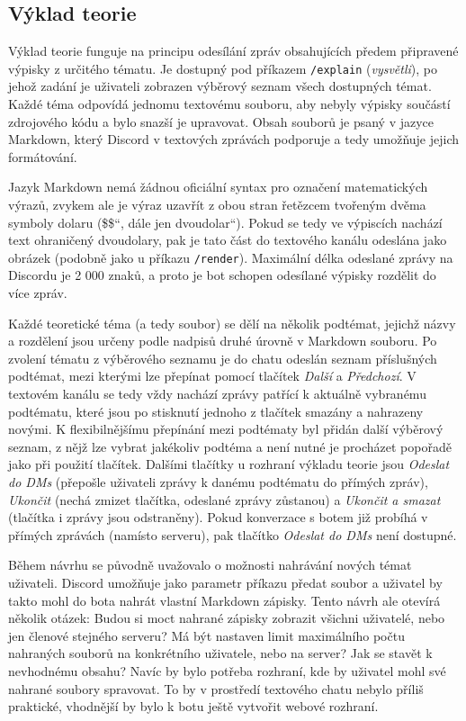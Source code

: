 \documentclass[FM]{tulthesis}
\begin{document}
	\subsection{Výklad teorie}
	
	Výklad teorie funguje na principu odesílání zpráv obsahujících předem připravené výpisky z určitého tématu. Je dostupný pod příkazem \verb*|/explain| (\textit{vysvětli}), po jehož zadání je uživateli zobrazen výběrový seznam všech dostupných témat. Každé téma odpovídá jednomu textovému souboru, aby nebyly výpisky součástí zdrojového kódu a bylo snazší je upravovat. Obsah souborů je psaný v jazyce Markdown, který Discord v textových zprávách podporuje a tedy umožňuje jejich formátování.
	
	Jazyk Markdown nemá žádnou oficiální syntax pro označení matematických výrazů, zvykem ale je výraz uzavřít z obou stran řetězcem tvořeným dvěma symboly dolaru (\quotedblbase\$\$\textquotedblleft, dále jen \quotedblbase dvoudolar\textquotedblleft). Pokud se tedy ve výpiscích nachází text ohraničený dvoudolary, pak je tato část do textového kanálu odeslána jako obrázek (podobně jako u příkazu \verb*|/render|). Maximální délka odeslané zprávy na Discordu je 2 000 znaků, a proto je bot schopen odesílané výpisky rozdělit do více zpráv. %
	
	Každé teoretické téma (a tedy soubor) se dělí na několik podtémat, jejichž názvy a rozdělení jsou určeny podle nadpisů druhé úrovně v Markdown souboru. Po zvolení tématu z výběrového seznamu je do chatu odeslán seznam příslušných podtémat, mezi kterými lze přepínat pomocí tlačítek \textit{Další} a \textit{Předchozí}. V textovém kanálu se tedy vždy nachází zprávy patřící k aktuálně vybranému podtématu, které jsou po stisknutí jednoho z tlačítek smazány a nahrazeny novými. K flexibilnějšímu přepínání mezi podtématy byl přidán další výběrový seznam, z nějž lze vybrat jakékoliv podtéma a není nutné je procházet popořadě jako při použití tlačítek. Dalšími tlačítky u rozhraní výkladu teorie jsou \textit{Odeslat do DMs} (přepošle uživateli zprávy k danému podtématu do přímých zpráv), \textit{Ukončit} (nechá zmizet tlačítka, odeslané zprávy zůstanou) a \textit{Ukončit a smazat} (tlačítka i zprávy jsou odstraněny). Pokud konverzace s botem již probíhá v přímých zprávách (namísto serveru), pak tlačítko \textit{Odeslat do DMs} není dostupné.
	
	Během návrhu se původně uvažovalo o možnosti nahrávání nových témat uživateli. Discord umožňuje jako parametr příkazu předat soubor a uživatel by takto mohl do bota nahrát vlastní Markdown zápisky. Tento návrh ale otevírá několik otázek: Budou si moct nahrané zápisky zobrazit všichni uživatelé, nebo jen členové stejného serveru? Má být nastaven limit maximálního počtu nahraných souborů na konkrétního uživatele, nebo na server? Jak se stavět k nevhodnému obsahu? Navíc by bylo potřeba rozhraní, kde by uživatel mohl své nahrané soubory spravovat. To by v prostředí textového chatu nebylo příliš praktické, vhodnější by bylo k botu ještě vytvořit webové rozhraní.
	
\end{document}
